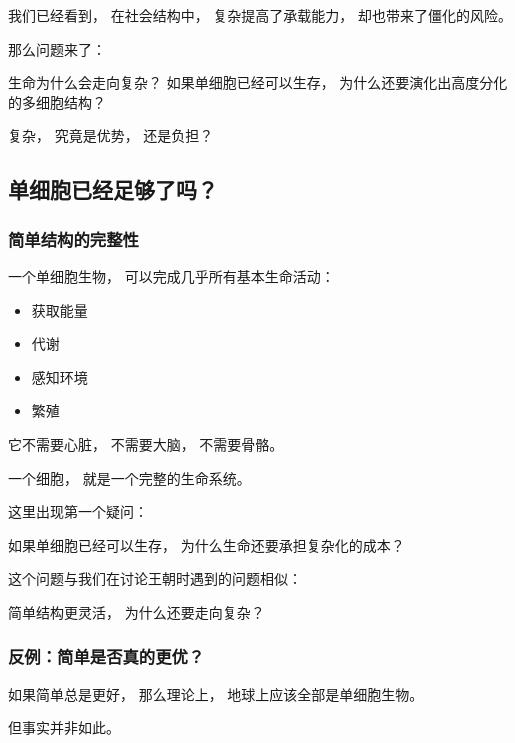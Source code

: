 \documentclass[openany, a4paper, 12pt]{book}
\newenvironment{motivation}{
	\vspace{0.5em}
	\begin{tcolorbox}[
		colback=gray!10,           %
		colframe=gray!60,          %
		title=\textit{本章动机 (Motivation)},
		fonttitle=\bfseries,
		arc=0mm,                   %
		leftrule=3mm               %
		]
		\small \itshape %
	}{
	\end{tcolorbox}
	\vspace{1em}
}
\begin{document}
\begin{motivation}
	我们已经看到，
	在社会结构中，
	复杂提高了承载能力，
	却也带来了僵化的风险。
	
	那么问题来了：
	
	生命为什么会走向复杂？
	如果单细胞已经可以生存，
	为什么还要演化出高度分化的多细胞结构？
	
	复杂，
	究竟是优势，
	还是负担？
\end{motivation}

\subsection{单细胞已经足够了吗？}

\subsubsection{简单结构的完整性}

一个单细胞生物，
可以完成几乎所有基本生命活动：

\begin{itemize}
	\item 获取能量
	\item 代谢
	\item 感知环境
	\item 繁殖
\end{itemize}

它不需要心脏，
不需要大脑，
不需要骨骼。

\begin{readingnote}
	一个细胞，
	就是一个完整的生命系统。
\end{readingnote}

这里出现第一个疑问：

\begin{questionbox}
	如果单细胞已经可以生存，
	为什么生命还要承担复杂化的成本？
\end{questionbox}

这个问题与我们在讨论王朝时遇到的问题相似：

简单结构更灵活，
为什么还要走向复杂？

\subsubsection{反例：简单是否真的更优？}

如果简单总是更好，
那么理论上，
地球上应该全部是单细胞生物。

但事实并非如此。
\end{document}
